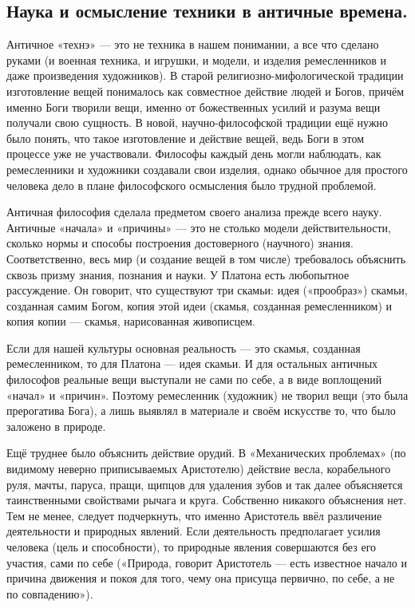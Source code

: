 \documentclass[a4paper]{article}
\begin{document}
{\subsection{Наука и осмысление техники в античные времена.}
Античное «технэ» — это не техника в нашем понимании, а все что сделано руками (и военная техника, и игрушки, и модели, и изделия ремесленников и даже произведения художников). В старой религиозно-мифологической традиции изготовление вещей понималось как совместное действие людей и Богов, причём именно Боги творили вещи, именно от божественных усилий и разума вещи получали свою сущность. В новой, научно-философской традиции ещё нужно было понять, что такое изготовление и действие вещей, ведь Боги в этом процессе уже не участвовали. Философы каждый день могли наблюдать, как ремесленники и художники создавали свои изделия, однако обычное для простого человека дело в плане философского осмысления было трудной проблемой.

Античная философия сделала предметом своего анализа прежде всего науку. Античные «начала» и «причины» — это не столько модели действительности, сколько нормы и способы построения достоверного (научного) знания. Соответственно, весь мир (и создание вещей в том числе) требовалось объяснить сквозь призму знания, познания и науки. У Платона есть любопытное рассуждение. Он говорит, что существуют три скамьи: идея («прообраз») скамьи, созданная самим Богом, копия этой идеи (скамья, созданная ремесленником) и копия копии — скамья, нарисованная живописцем.

Если для нашей культуры основная реальность — это скамья, созданная ремесленником, то для Платона — идея скамьи. И для остальных античных философов реальные вещи выступали не сами по себе, а в виде воплощений «начал» и «причин». Поэтому ремесленник (художник) не творил вещи (это была прерогатива Бога), а лишь выявлял в материале и своём искусстве то, что было заложено в природе.

Ещё труднее было объяснить действие орудий. В «Механических проблемах» (по видимому неверно приписываемых Аристотелю) действие весла, корабельного руля, мачты, паруса, пращи, щипцов для удаления зубов и так далее объясняется таинственными свойствами рычага и круга. Собственно никакого объяснения нет. Тем не менее, следует подчеркнуть, что именно Аристотель ввёл различение деятельности и природных явлений. Если деятельность предполагает усилия человека (цель и способности), то природные явления совершаются без его участия, сами по себе («Природа, говорит Аристотель — есть известное начало и причина движения и покоя для того, чему она присуща первично, по себе, а не по совпадению»).

}
\end{document}
